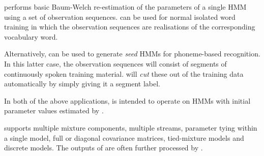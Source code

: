 %
%

\newpage
{}


 performs basic Baum-Welch re-estimation of the parameters of
a single HMM using a set of observation sequences.   can be used
for normal isolated word training in which the observation sequences
are realisations of the corresponding vocabulary word.  

Alternatively,
 can be used to generate \textit{seed} HMMs for phoneme-based
recognition.  In this latter case, the observation sequences will consist
of segments of continuously spoken training material.   will
\textit{cut} these out of the training data automatically by simply
giving it a segment label.

In both of the above applications,  is intended to operate on
HMMs with initial parameter values estimated by .

 supports multiple mixture components, multiple streams,
parameter tying within a single model, full or diagonal
covariance matrices, tied-mixture models and discrete models.  
The outputs of  are often further 
processed by .

